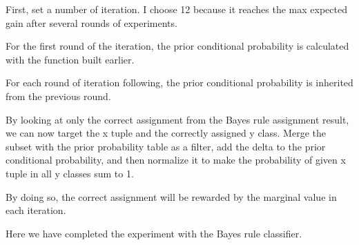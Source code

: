 \documentclass{article}
\begin{document}
\begin{multicols}{2}
        First, set a number of iteration. I choose 12 because it reaches the max expected gain after several rounds of experiments. 

        For the first round of the iteration, the prior conditional probability is calculated with the function built earlier.

        For each round of iteration following, the prior conditional probability is inherited from the previous round. 

        By looking at only the correct assignment from the Bayes rule assignment result, we can now target the x tuple and the correctly assigned y class. Merge the subset with the prior probability table as a filter, add the delta to the prior conditional probability, and then normalize it to make the probability of given x tuple in all y classes sum to 1. 

        By doing so, the correct assignment will be rewarded by the marginal value in each iteration. 

        Here we have completed the experiment with the Bayes rule classifier.


\end{multicols}
\end{document}

